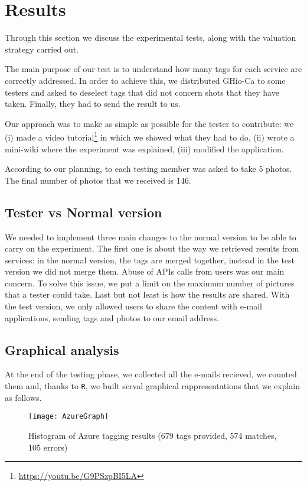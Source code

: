 \section{Results}
\label{sec:results}

Through this section we discuss the experimental tests, along with the valuation strategy carried out. 

The main purpose of our test is to understand how many tags for each service are correctly addressed. In order to achieve this, we distributed GHio-Ca to some testers and asked to deselect tags that did not concern shots that they have taken. Finally, they had to send the result to us.

Our approach was to make as simple as possible for the tester to contribute: we (i) made a video tutorial\footnote{\url{https://youtu.be/G9PSzpBI5LA}} in which we showed what they had to do, (ii) wrote a mini-wiki where the experiment was explained, (iii) modified the application. 

According to our planning, to each testing member was asked to take 5 photos. The final number of photos that we received is 146.

\subsection{Tester vs Normal version}

We needed to implement three main changes to the normal version to be able to carry on the experiment. The first one is about the way we retrieved results from services: in the normal version, the tags are merged together, instead in the test version we did not merge them.
Abuse of APIs calls from users was our main concern. To solve this issue, we put a limit on the maximum number of pictures that a tester could take.
Last but not least is how the results are shared. With the test version, we only allowed users to share the content with e-mail applications, sending tags and photos to our email address.


\subsection{Graphical analysis}

At the end of the testing phase, we collected all the e-mails recieved, we counted them and, thanks to \texttt{R}, we built serval graphical rappresentations that we explain as follows.

\begin{figure}[H]
\centering
\texttt{[image: AzureGraph]}
\caption{Histogram of Azure tagging results (679 tags provided, 574 matches, 105 errors)}
\label{img:testgraphsazure}
\end{figure}

